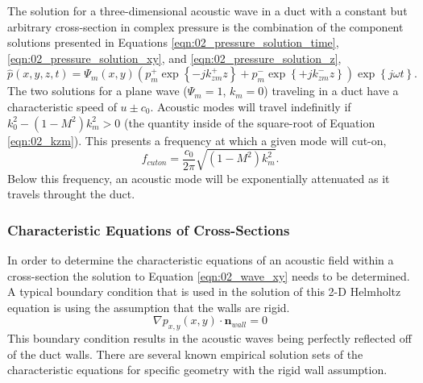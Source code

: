 The solution for a three-dimensional acoustic wave in a duct with a constant but arbitrary cross-section in complex pressure is the combination of the component solutions presented in Equations \ref{eqn:02_pressure_solution_time}, \ref{eqn:02_pressure_solution_xy}, and \ref{eqn:02_pressure_solution_z},
\begin{equation}
  \hat{p}(x,y,z,t) = \Psi_m(x,y)\left(p^+_m\exp{\left\{-jk^+_{zm}z\right\}}+p^-_m\exp{\left\{+jk^-_{zm}z\right\}}\right)\exp\left\{j\omega t\right\} \textrm{.}
  \label{eqn:02_pressure_solution_duct}
\end{equation}
The two solutions for a plane wave ($\Psi_m=1$, $k_m=0$) traveling in a duct have a characteristic speed of $u\pm c_0$.
Acoustic modes will travel indefinitly if $k_0^2-(1-M^2)k_m^2>0$ (the quantity inside of the square-root of Equation \ref{eqn:02_kzm}).
This presents a frequency at which a given mode will cut-on,
\begin{equation}
  f_{cuton} = \frac{c_0}{2\pi}\sqrt{(1-M^2)k_m^2} \textrm{.}
  \label{eqn:02_cuton_freq}
\end{equation}
Below this frequency, an acoustic mode will be exponentially attenuated as it travels throught the duct.

\subsubsection{Characteristic Equations of Cross-Sections}
In order to determine the characteristic equations of an acoustic field within a cross-section the solution to Equation \ref{eqn:02_wave_xy} needs to be determined.
A typical boundary condition that is used in the solution of this 2-D Helmholtz equation is using the assumption that the walls are rigid.
\begin{equation}
  \nabla p_{x,y}(x,y)\cdot\mathbf{n}_{wall} = 0
  \label{eqn:02_bc_rigig_wall}
\end{equation}
This boundary condition results in the acoustic waves being perfectly reflected off of the duct walls.
There are several known empirical solution sets of the characteristic equations for specific geometry with the rigid wall assumption.

